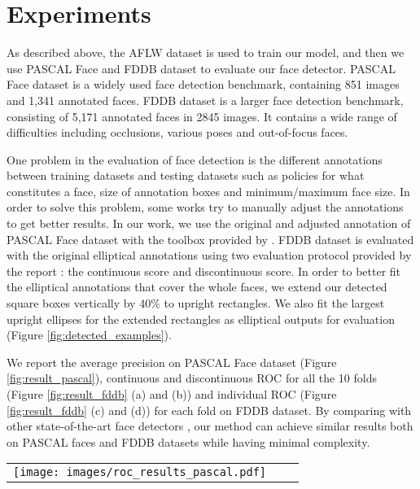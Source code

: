 \documentclass[10pt,twocolumn,letterpaper]{article}
\begin{document}
\section{Experiments}
As described above, the AFLW dataset is used to train our model, and then we use PASCAL Face \cite{yan2014face} and FDDB dataset \cite{fddbTech} to evaluate our face detector. PASCAL Face dataset is a widely used face detection benchmark, containing 851 images and 1,341 annotated faces. FDDB dataset is a larger face detection benchmark, consisting of 5,171 annotated faces in 2845 images. It contains a wide range of difficulties including occlusions, various poses and out-of-focus faces.

One problem in the evaluation of face detection is the different annotations between training datasets and testing datasets such as policies for what constitutes a face, size of annotation boxes and minimum/maximum face size. In order to solve this problem, some works \cite{li2015convolutional,mathias2014face, yang2014aggregate} try to manually adjust the annotations to get better results. In our work, we use the original and adjusted annotation \cite{mathias2014face} of PASCAL Face dataset with the toolbox provided by \cite{mathias2014face}. FDDB dataset is evaluated with the original elliptical annotations using two evaluation protocol provided by the report \cite{fddbTech}: the continuous score and discontinuous score. In order to better fit the elliptical annotations that cover the whole faces, we extend our detected square boxes vertically by 40\% to upright rectangles. We also fit the largest upright ellipses for the extended rectangles as elliptical outputs for evaluation (Figure \ref{fig:detected_examples}).


We report the average precision on PASCAL Face dataset (Figure \ref{fig:result_pascal}), continuous and discontinuous ROC for all the 10 folds (Figure \ref{fig:result_fddb} (a) and (b)) and individual ROC (Figure \ref{fig:result_fddb} (c) and (d)) for each fold on FDDB dataset. By comparing with other state-of-the-art face detectors \cite{farfade2015multi, li2015convolutional, markuvs2013method, chen2014joint, li2014efficient, li2013learning, kostinger2012robust, jain2011online, subburaman2010fast}, our method can achieve similar results both on PASCAL faces \cite{yan2014face} and FDDB \cite{fddbTech} datasets while having minimal complexity. 

\begin{figure*}[!htb]
\begin{tabular}{ccc}
\rule{0pt}{1ex}\hspace{2.24mm}\texttt{[image: images/roc\_results\_pascal.pdf]}\\[-0.1pt]
\end{tabular}
\caption{Performance comparison on PASCAL Face dataset}
\label{fig:result_pascal}
\end{figure*}
\end{document}
